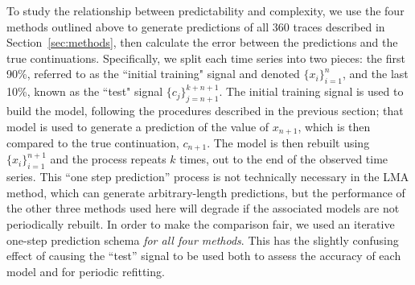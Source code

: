 To study the relationship between predictability and complexity, we
use the four methods outlined above to generate predictions of all 360
traces described in Section~\ref{sec:methods}, then calculate the
error between the predictions and the true continuations.
Specifically, we split each time series into two pieces: the first
90\%, referred to as the ``initial training" signal and denoted
$\{x_i\}_{i=1}^{n}$, and the last 10\%, known as the ``test" signal
$\{c_j\}_{j=n+1}^{k+n+1}$.  The initial training signal is used to
build the model, following the procedures described in the previous
section; that model is used to generate a prediction of the value of
$x_{n+1}$, which is then compared to the true continuation, $c_{n+1}$.
The model is then rebuilt using $\{x_i\}_{i=1}^{n+1}$ and the process
repeats $k$ times, out to the end of the observed time series.  This
``one step prediction'' process is not technically necessary in the
LMA method, which can generate arbitrary-length predictions, but the
performance of the other three methods used here will degrade if the
associated models are not periodically rebuilt.  In order to make the
comparison fair, we used an iterative one-step prediction schema {\sl
  for all four methods}.  This has the slightly confusing effect of
causing the ``test'' signal to be used both to assess the accuracy of
each model and for periodic refitting.

